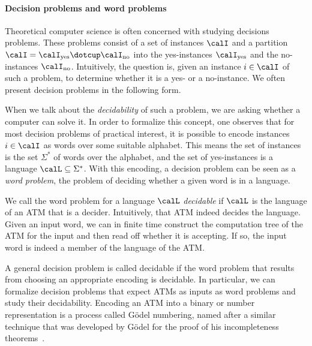 \documentclass[../../diss.tex]{subfiles}
\begin{document}
\paragraph{Decision problems and word problems}

Theoretical computer science is often concerned with studying decisions problems.
These problems consist of a set of instances $\calI$ and a partition $\calI = \calI_{\text{yes}} \dotcup \calI_{\text{no}}$ into the yes-instances $\calI_{\text{yes}}$ and the no-instances $\calI_{\text{no}}$.
Intuitively, the question is, given an instance $i \in \calI$ of such a problem, to determine whether it is a yes- or a no-instance.
We often present decision problems in the following form.

\begin{problem}
\end{problem}

When we talk about the \emph{decidability} of such a problem, we are asking whether a computer can solve it.
In order to formalize this concept, one observes that for most decision problems of practical interest, it is possible to encode instances $i \in \calI$ as words over some suitable alphabet.
This means the set of instances is the set $\Sigma^*$ of words over the alphabet, and the set of yes-instances is a language $\calL \subseteq \Sigma^*$.
With this encoding, a decision problem can be seen as a \emph{word problem}, the problem of deciding whether a given word is in a language.

\begin{problem}
\end{problem}

We call the word problem for a language $\calL$ \emph{decidable} if $\calL$ is the language of an ATM that is a decider.
Intuitively, that ATM indeed decides the language.
Given an input word, we can in finite time construct the computation tree of the ATM for the input and then read off whether it is accepting.
If so, the input word is indeed a member of the language of the ATM.\@

A general decision problem is called decidable if the word problem that results from choosing an appropriate encoding is decidable.
In particular, we can formalize decision problems that expect ATMs as inputs as word problems and study their decidability.
Encoding an ATM into \eg a binary or number representation is a process called Gödel numbering, named after a similar technique that was developed by Gödel for the proof of his incompleteness theorems~\cite{Goedel31}.
\end{document}
